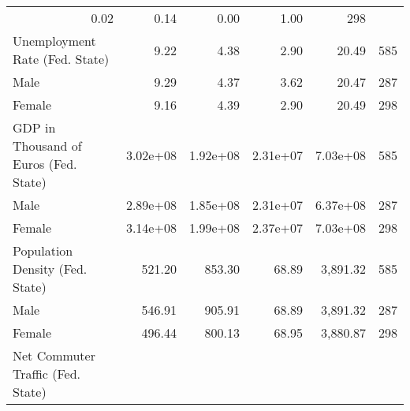 \documentclass{article}
\begin{document}
\begin{table}[ht]
{\begin{tabular}{llllll}
  \multicolumn{1}{r}{0.02} &
  \multicolumn{1}{r}{0.14} &
  \multicolumn{1}{r}{0.00} &
  \multicolumn{1}{r}{1.00} &
  \multicolumn{1}{r}{298} \\
\multicolumn{1}{l}{Unemployment Rate (Fed. State)} &
  \multicolumn{1}{r}{9.22} &
  \multicolumn{1}{r}{4.38} &
  \multicolumn{1}{r}{2.90} &
  \multicolumn{1}{r}{20.49} &
  \multicolumn{1}{r}{585} \\
\multicolumn{1}{l}{\hspace{1em}Male} &
  \multicolumn{1}{r}{9.29} &
  \multicolumn{1}{r}{4.37} &
  \multicolumn{1}{r}{3.62} &
  \multicolumn{1}{r}{20.47} &
  \multicolumn{1}{r}{287} \\
\multicolumn{1}{l}{\hspace{1em}Female} &
  \multicolumn{1}{r}{9.16} &
  \multicolumn{1}{r}{4.39} &
  \multicolumn{1}{r}{2.90} &
  \multicolumn{1}{r}{20.49} &
  \multicolumn{1}{r}{298} \\
\multicolumn{1}{l}{GDP in Thousand of Euros (Fed. State)} &
  \multicolumn{1}{r}{3.02e+08} &
  \multicolumn{1}{r}{1.92e+08  } &
  \multicolumn{1}{r}{2.31e+07} &
  \multicolumn{1}{r}{7.03e+08} &
  \multicolumn{1}{r}{585} \\
\multicolumn{1}{l}{\hspace{1em}Male} &
  \multicolumn{1}{r}{2.89e+08} &
  \multicolumn{1}{r}{1.85e+08} &
  \multicolumn{1}{r}{2.31e+07} &
  \multicolumn{1}{r}{6.37e+08} &
  \multicolumn{1}{r}{287} \\
\multicolumn{1}{l}{\hspace{1em}Female} &
  \multicolumn{1}{r}{3.14e+08} &
  \multicolumn{1}{r}{1.99e+08} &
  \multicolumn{1}{r}{2.37e+07} &
  \multicolumn{1}{r}{7.03e+08  } &
  \multicolumn{1}{r}{298} \\
\multicolumn{1}{l}{Population Density (Fed. State)} &
  \multicolumn{1}{r}{521.20} &
  \multicolumn{1}{r}{853.30} &
  \multicolumn{1}{r}{68.89} &
  \multicolumn{1}{r}{3,891.32} &
  \multicolumn{1}{r}{585} \\
\multicolumn{1}{l}{\hspace{1em}Male} &
  \multicolumn{1}{r}{546.91} &
  \multicolumn{1}{r}{905.91} &
  \multicolumn{1}{r}{68.89} &
  \multicolumn{1}{r}{3,891.32} &
  \multicolumn{1}{r}{287} \\
\multicolumn{1}{l}{\hspace{1em}Female} &
  \multicolumn{1}{r}{496.44} &
  \multicolumn{1}{r}{800.13} &
  \multicolumn{1}{r}{68.95} &
  \multicolumn{1}{r}{3,880.87} &
  \multicolumn{1}{r}{298} \\
\multicolumn{1}{l}{Net Commuter Traffic (Fed. State)} &

\end{tabular}}
\end{table}
\end{document}
